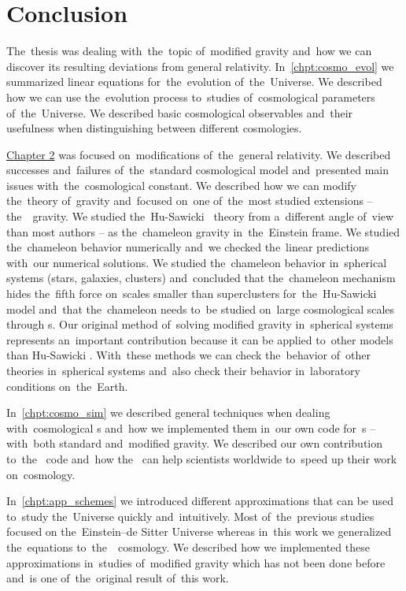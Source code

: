 \chapter*{Conclusion}
The~thesis was dealing with~the~topic of~modified gravity and~how we can discover its resulting deviations from general relativity. In~\autoref{chpt:cosmo_evol} we summarized linear equations for~the~evolution of~the~Universe. We described how we can use the~evolution process to~studies of~cosmological parameters of~the~Universe. We described basic cosmological observables and~their usefulness when distinguishing between different cosmologies.

\hyperref[chpt:de_mg]{Chapter 2} was focused on~modifications of~the~general relativity. We described successes and~failures of~the~standard cosmological model and~presented main issues with~the~cosmological constant. We described how we can modify the~theory of~gravity and~focused on~one of~the~most studied extensions -- the~\fR\ gravity. We studied the~Hu-Sawicki \fR\ theory from a~different angle of~view than most authors -- as the~chameleon gravity in~the~Einstein frame. We studied the~chameleon behavior numerically and~we checked the~linear predictions with~our numerical solutions. We studied the~chameleon behavior in~spherical systems (stars, galaxies, clusters) and~concluded that the~chameleon mechanism hides the~fifth force on~scales smaller than superclusters for~the~Hu-Sawicki model and~that the~chameleon needs to~be studied on~large cosmological scales through \nbodysim s. Our original method of~solving modified gravity in~spherical systems represents an~important contribution because it can be applied to~other models than Hu-Sawicki \fR. With~these methods we can check the~behavior of~other theories in~spherical systems and~also check their behavior in~laboratory conditions on~the~Earth.

In~\autoref{chpt:cosmo_sim} we described general techniques when dealing with~cosmological \nbodysim s and~how we implemented them in~our own code for~\nbodysim s -- with~both standard and~modified gravity. We described our own contribution to~the~ code and~how the~ can help scientists worldwide to~speed up their work on~cosmology.

In~\autoref{chpt:app_schemes} we introduced different approximations that can be used to~study the~Universe quickly and~intuitively. Most of~the~previous studies focused on the~Einstein--de Sitter Universe whereas in~this work we generalized the~equations to~the~\LCDM\ cosmology. We described how we implemented these approximations in~studies of~modified gravity which has not been done before and~is one of~the~original result of~this work.

